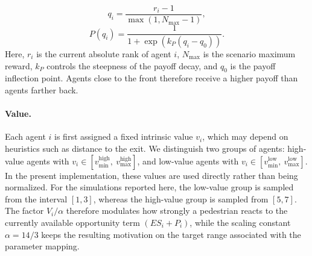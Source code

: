 \documentclass[pdflatex,sn-mathphys-num]{sn-jnl}%
\theoremstyle{thmstyleone}%
\theoremstyle{thmstyletwo}%
\theoremstyle{thmstylethree}%
\begin{document}
\begin{equation}
q_i = \frac{r_i - 1}{\max(1, N_{\text{max}}-1)},
\label{eq:competition}
\end{equation}
\begin{equation}
P(q_i)= \frac{1}{1+\exp\left(k_P(q_i-q_0)\right)}.
\end{equation}
Here, \(r_i\) is the current absolute rank of agent \(i\), \(N_{\text{max}}\) is the scenario maximum reward, \(k_P\) controls the steepness of the payoff decay, and \(q_0\) is the payoff inflection point. Agents close to the front therefore receive a higher payoff than agents farther back.

\paragraph{Value.}  
Each agent \( i \) is first assigned a fixed intrinsic value \(v_i\), which
may depend on heuristics such as distance to the exit. We distinguish two
groups of agents: high-value agents with
\(v_i \in [v_{\min}^{\text{high}},\ v_{\max}^{\text{high}}]\), and low-value
agents with \(v_i \in [v_{\min}^{\text{low}},\ v_{\max}^{\text{low}}]\).
In the present implementation, these values are used directly rather than
being normalized. For the simulations reported here, the low-value group is
sampled from the interval \([1,3]\), whereas the high-value group is sampled
from \([5,7]\). The factor \(V_i/\alpha\) therefore modulates how strongly a
pedestrian reacts to the currently available opportunity term
\((ES_i + P_i)\), while the scaling constant \(\alpha=14/3\) keeps the
resulting motivation on the target range associated with the parameter
mapping.
\end{document}
